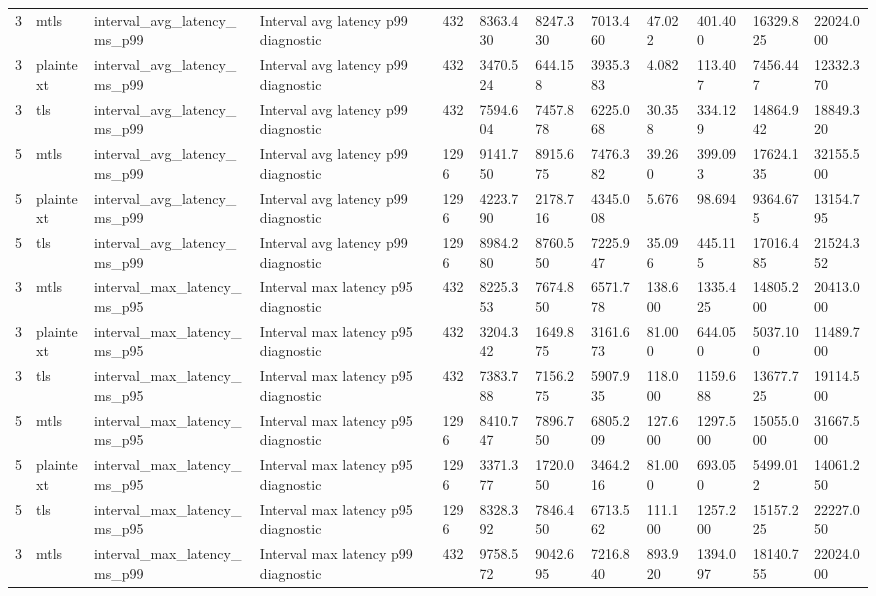 \begin{longtable}{llllllllllll}
3 & mtls & interval\_avg\_latency\_ms\_p99 & Interval avg latency p99 diagnostic & 432 & 8363.430 & 8247.330 & 7013.460 & 47.022 & 401.400 & 16329.825 & 22024.000 \\
3 & plaintext & interval\_avg\_latency\_ms\_p99 & Interval avg latency p99 diagnostic & 432 & 3470.524 & 644.158 & 3935.383 & 4.082 & 113.407 & 7456.447 & 12332.370 \\
3 & tls & interval\_avg\_latency\_ms\_p99 & Interval avg latency p99 diagnostic & 432 & 7594.604 & 7457.878 & 6225.068 & 30.358 & 334.129 & 14864.942 & 18849.320 \\
5 & mtls & interval\_avg\_latency\_ms\_p99 & Interval avg latency p99 diagnostic & 1296 & 9141.750 & 8915.675 & 7476.382 & 39.260 & 399.093 & 17624.135 & 32155.500 \\
5 & plaintext & interval\_avg\_latency\_ms\_p99 & Interval avg latency p99 diagnostic & 1296 & 4223.790 & 2178.716 & 4345.008 & 5.676 & 98.694 & 9364.675 & 13154.795 \\
5 & tls & interval\_avg\_latency\_ms\_p99 & Interval avg latency p99 diagnostic & 1296 & 8984.280 & 8760.550 & 7225.947 & 35.096 & 445.115 & 17016.485 & 21524.352 \\
3 & mtls & interval\_max\_latency\_ms\_p95 & Interval max latency p95 diagnostic & 432 & 8225.353 & 7674.850 & 6571.778 & 138.600 & 1335.425 & 14805.200 & 20413.000 \\
3 & plaintext & interval\_max\_latency\_ms\_p95 & Interval max latency p95 diagnostic & 432 & 3204.342 & 1649.875 & 3161.673 & 81.000 & 644.050 & 5037.100 & 11489.700 \\
3 & tls & interval\_max\_latency\_ms\_p95 & Interval max latency p95 diagnostic & 432 & 7383.788 & 7156.275 & 5907.935 & 118.000 & 1159.688 & 13677.725 & 19114.500 \\
5 & mtls & interval\_max\_latency\_ms\_p95 & Interval max latency p95 diagnostic & 1296 & 8410.747 & 7896.750 & 6805.209 & 127.600 & 1297.500 & 15055.000 & 31667.500 \\
5 & plaintext & interval\_max\_latency\_ms\_p95 & Interval max latency p95 diagnostic & 1296 & 3371.377 & 1720.050 & 3464.216 & 81.000 & 693.050 & 5499.012 & 14061.250 \\
5 & tls & interval\_max\_latency\_ms\_p95 & Interval max latency p95 diagnostic & 1296 & 8328.392 & 7846.450 & 6713.562 & 111.100 & 1257.200 & 15157.225 & 22227.050 \\
3 & mtls & interval\_max\_latency\_ms\_p99 & Interval max latency p99 diagnostic & 432 & 9758.572 & 9042.695 & 7216.840 & 893.920 & 1394.097 & 18140.755 & 22024.000 \\

\end{longtable}
